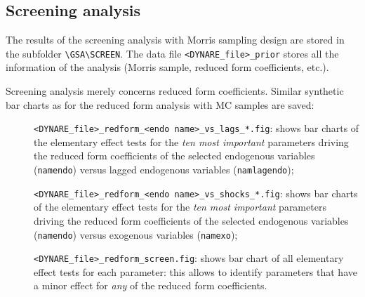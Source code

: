 \documentclass[12pt,a4paper]{article}
\begin{document}
\subsection{Screening analysis}
The results of the screening analysis with Morris sampling design
are stored in the subfolder \verb"\GSA\SCREEN". The data file
\verb"<DYNARE_file>_prior" stores all the information of the
analysis (Morris sample, reduced form coefficients, etc.).

Screening analysis merely concerns reduced form coefficients.
Similar synthetic bar charts as for the reduced form analysis with
MC samples are saved:
\begin{description}
\item[]\verb"<DYNARE_file>_redform_<endo name>_vs_lags_*.fig":
shows bar charts of the elementary effect tests for the \emph{ten
most important} parameters driving the reduced form coefficients
of the selected endogenous variables (\verb"namendo") versus
lagged endogenous variables (\verb"namlagendo");
\item[]\verb"<DYNARE_file>_redform_<endo name>_vs_shocks_*.fig":
shows bar charts of the elementary effect tests for the \emph{ten
most important} parameters driving the reduced form coefficients
of the selected endogenous variables (\verb"namendo") versus
exogenous variables (\verb"namexo");
\item[]\verb"<DYNARE_file>_redform_screen.fig": shows bar chart of
all elementary effect tests for each  parameter: this allows to
identify parameters that have a minor effect for \emph{any} of the
reduced form coefficients.
\end{description}



%
%


\newpage
\end{document}
